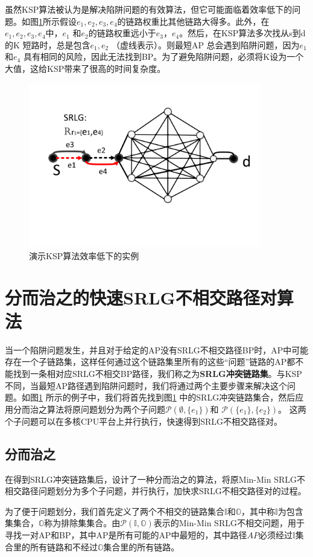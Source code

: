 虽然KSP算法被认为是解决陷阱问题的有效算法，但它可能面临着效率低下的问题。如图\ref{fig:KSPproblem}所示假设$e_1, e_2, e_3, e_4$的链路权重比其他链路大得多。此外，在$e_1, e_2, e_3, e_4$中，$e_1$ 和$e_2$的链路权重远小于$e_3$，$e_4$。然后，在KSP算法多次找从s到d的K 短路时，总是包含$e_1,e_2$ （虚线表示）。则最短AP 总会遇到陷阱问题，因为$e_1$和$e_4$ 具有相同的风险，因此无法找到BP。为了避免陷阱问题，必须将K设为一个大值，这给KSP带来了很高的时间复杂度。
\begin{figure}[htbp]
\centering
\includegraphics[width=4.0in]{figures/KSPproblem}
  \caption{演示KSP算法效率低下的实例}
  \label{fig:KSPproblem}
\end{figure}


\section{分而治之的快速SRLG不相交路径对算法}
当一个陷阱问题发生，并且对于给定的AP没有SRLG不相交路径BP时，AP中可能存在一个子链路集，这样任何通过这个链路集里所有的这些“问题”链路的AP都不能找到一条相对应SRLG不相交BP路径，我们称之为\textbf{SRLG冲突链路集}。与KSP 不同，当最短AP路径遇到陷阱问题时，我们将通过两个主要步骤来解决这个问题。如图\ref{fig:KSPproblem} 所示的例子中，我们将首先找到图\ref{fig:KSPproblem} 中的SRLG冲突链路集合，然后应用分而治之算法将原问题划分为两个子问题$\mathcal{P}(\emptyset,\{e_1\})$和 $\mathcal{P}(\{e_1\},\{e_2\})$。 这两个子问题可以在多核CPU平台上并行执行，快速得到SRLG不相交路径对。
\subsection{分而治之}
在得到SRLG冲突链路集后，设计了一种分而治之的算法，将原Min-Min SRLG不相交路径问题划分为多个子问题，并行执行，加快求SRLG不相交路径对的过程。

为了便于问题划分，我们首先定义了两个不相交的链路集合$\mathbb{I}$和$\mathbb{O}$，其中称$\mathbb{I}$为包含集集合，$\mathbb{O}$称为排除集集合。由$\mathcal{P}({\mathbb{I},\mathbb{O}})$表示的Min-Min SRLG不相交问题，用于寻找一对AP和BP，其中AP是所有可能的AP中最短的，其中路径$AP$必须经过$\mathbb{I}$集合里的所有链路和不经过$\mathbb{O}$集合里的所有链路。

